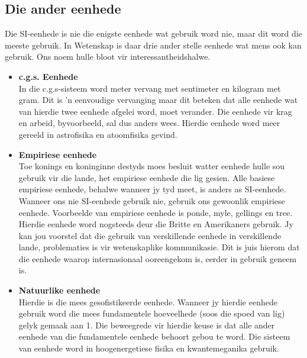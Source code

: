  \subsection*{Die ander eenhede}
            \nopagebreak
Die SI-eenhede is nie die enigste eenhede wat gebruik word nie, maar dit word die meeste gebruik. In Wetenskap is daar drie ander stelle eenhede wat mens ook kan gebruik. Ons noem hulle bloot vir interessantheidshalwe. 
\begin{itemize}
 \item \textbf{c.g.s. Eenhede} \\
In die c.g.s-sisteem word meter vervang met sentimeter en kilogram met gram. Dit is  'n eenvoudige vervanging maar dit beteken dat alle eenhede wat van hierdie twee eenhede afgelei word, moet verander. Die eenhede vir krag en arbeid, byvoorbeeld, sal dus anders wees. Hierdie eenhede word meer gereeld in astrofisika en atoomfisika gevind.
\item \textbf{Empiriese eenhede} \\
Toe konings en koninginne destyds moes besluit watter eenhede hulle sou gebruik vir die lande, het empiriese eenhede die lig gesien. Alle basiese empiriese eenhede, behalwe wanneer jy tyd meet, is anders as SI-eenhede. Wanneer ons nie SI-eenhede gebruik nie, gebruik ons gewoonlik empiriese eenhede. Voorbeelde van empiriese eenhede is ponde, myle, gellings en tree. Hierdie eenhede word nogsteeds deur die Britte en Amerikaners gebruik. Jy kan jou voorstel dat die gebruik van verskillende eenhede in verskillende lande, problematies is vir wetenskaplike kommunikasie. Dit is juis hierom dat die eenhede waarop internasionaal ooreengekom is, eerder in gebruik geneem is.
\item \textbf{Natuurlike eenhede} \\
Hierdie is die mees gesofistikeerde eenhede. Wanneer jy hierdie eenhede gebruik word die mees fundamentele hoeveelhede (soos die spoed van lig) gelyk gemaak aan 1. Die beweegrede vir hierdie keuse is dat alle ander eenhede van die fundamentele eenhede behoort gebou te word. Die sisteem van eenhede word in hoogenergetiese fisika en kwantemeganika gebruik. 
\end{itemize}
